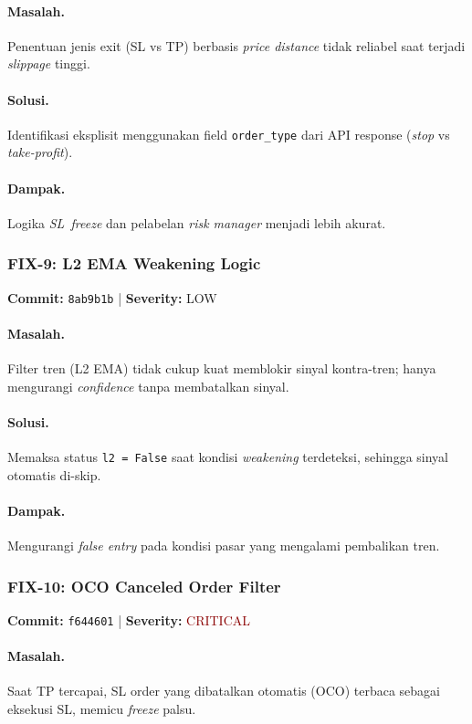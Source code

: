 \documentclass[10pt,a4paper]{article}
\begin{document}
\paragraph{Masalah.} Penentuan jenis exit (SL vs TP) berbasis \textit{price distance} tidak reliabel saat terjadi \textit{slippage} tinggi.
\paragraph{Solusi.} Identifikasi eksplisit menggunakan field \texttt{order\_type} dari API response (\textit{stop} vs \textit{take-profit}).
\paragraph{Dampak.} Logika \textit{SL~freeze} dan pelabelan \textit{risk manager} menjadi lebih akurat.

\subsubsection{FIX-9: L2 EMA Weakening Logic}
\textbf{Commit:} \texttt{8ab9b1b} | \textbf{Severity:} LOW

\paragraph{Masalah.} Filter tren (L2 EMA) tidak cukup kuat memblokir sinyal kontra-tren; hanya mengurangi \textit{confidence} tanpa membatalkan sinyal.
\paragraph{Solusi.} Memaksa status \texttt{l2\,=\,False} saat kondisi \textit{weakening} terdeteksi, sehingga sinyal otomatis di-skip.
\paragraph{Dampak.} Mengurangi \textit{false entry} pada kondisi pasar yang mengalami pembalikan tren.

\subsubsection{FIX-10: OCO Canceled Order Filter}
\textbf{Commit:} \texttt{f644601} | \textbf{Severity:} \textcolor{darkred}{CRITICAL}

\paragraph{Masalah.} Saat TP tercapai, SL order yang dibatalkan otomatis (OCO) terbaca sebagai eksekusi SL, memicu \textit{freeze} palsu.
\end{document}
